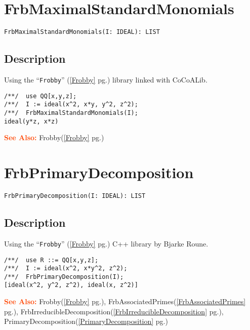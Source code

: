 \documentclass[a4paper]{mybook}
\newenvironment{command}{}{} %
\newcommand\SeeAlso{\par\textcolor{OrangeRed}{\textbf{\large See Also: }}}
\begin{document}
\section{FrbMaximalStandardMonomials}
\label{FrbMaximalStandardMonomials}
\begin{command} %


\begin{Verbatim}[label=syntax, rulecolor=\color{MidnightBlue},
frame=single]
FrbMaximalStandardMonomials(I: IDEAL): LIST
\end{Verbatim}


\subsection*{Description}

Using the ``\verb&Frobby&'' (\ref{Frobby} pg.\pageref{Frobby}) library linked with CoCoALib.
\begin{Verbatim}[label=example, rulecolor=\color{PineGreen}, frame=single]
/**/  use QQ[x,y,z];
/**/  I := ideal(x^2, x*y, y^2, z^2);
/**/  FrbMaximalStandardMonomials(I);
ideal(y*z, x*z)
\end{Verbatim}


\SeeAlso %
  Frobby(\ref{Frobby} pg.\pageref{Frobby})
\end{command} %

\section{FrbPrimaryDecomposition}
\label{FrbPrimaryDecomposition}
\begin{command} %


\begin{Verbatim}[label=syntax, rulecolor=\color{MidnightBlue},
frame=single]
FrbPrimaryDecomposition(I: IDEAL): LIST
\end{Verbatim}


\subsection*{Description}

Using the ``\verb&Frobby&'' (\ref{Frobby} pg.\pageref{Frobby}) C++ library by Bjarke Roune.
\begin{Verbatim}[label=example, rulecolor=\color{PineGreen}, frame=single]
/**/  use R ::= QQ[x,y,z];
/**/  I := ideal(x^2, x*y^2, z^2);
/**/  FrbPrimaryDecomposition(I);
[ideal(x^2, y^2, z^2), ideal(x, z^2)]
\end{Verbatim}


\SeeAlso %
  Frobby(\ref{Frobby} pg.\pageref{Frobby}), 
    FrbAssociatedPrimes(\ref{FrbAssociatedPrimes} pg.\pageref{FrbAssociatedPrimes}), 
    FrbIrreducibleDecomposition(\ref{FrbIrreducibleDecomposition} pg.\pageref{FrbIrreducibleDecomposition}), 
    PrimaryDecomposition(\ref{PrimaryDecomposition} pg.\pageref{PrimaryDecomposition})
\end{command} %
\end{document}
